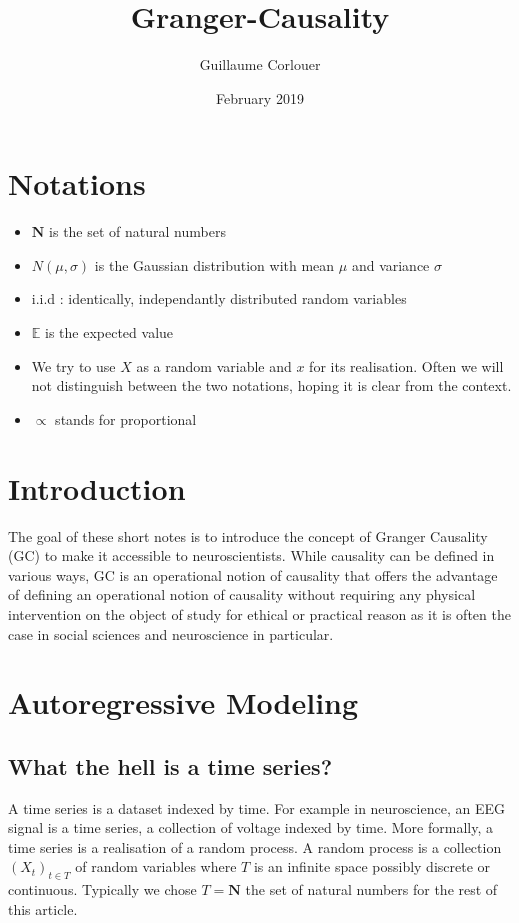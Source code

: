 \documentclass{article}
\title{Granger-Causality}
\author{Guillaume Corlouer}
\date{February 2019}
\begin{document}
\maketitle
\tableofcontents
\section{Notations}
\begin{itemize}
    \item $\mathbf{N}$ is the set of natural numbers
    \item $N(\mu,\sigma)$ is the Gaussian distribution with mean $\mu$ and variance $\sigma$
    \item i.i.d : identically, independantly distributed random variables
    \item $\mathds{E}$ is the expected value
    \item We try to use $X$ as a random variable and $x$ for its realisation. Often we will not distinguish between the two notations, hoping it is clear from the context.
    \item $\propto$ stands for proportional
\end{itemize}
\section{Introduction}
The goal of these short notes is to introduce the concept of Granger Causality (GC) to make it accessible to neuroscientists. While causality can be defined in various ways, GC is an operational notion of causality that offers the advantage of defining an operational notion of causality without requiring any physical intervention on the object of study for ethical or practical reason as it is often the case in social sciences and neuroscience in particular.  
\section{Autoregressive Modeling}
\subsection{What the hell is a time series?}
A time series is a dataset indexed by time. For example in neuroscience, an EEG signal is a time series, a collection of voltage indexed by time. More formally, a time series is a realisation of a random process. A random process is a collection $(X_t)_{t\in T}$ of random variables where $T$ is an infinite space possibly discrete or continuous. Typically we chose $T=\mathbf{N}$ the set of natural numbers for the rest of this article. 
\end{document}
